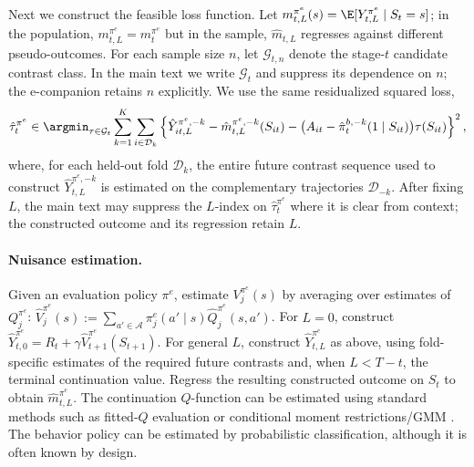 \documentclass[opre,nonblindrev]{informs4}
\newenvironment{revision}{\begingroup\color{revisionblue}\ignorespaces}{\endgroup}
\let\arxivSavedArgmin\argmin
\let\argmin\undefined
\let\argmin\arxivSavedArgmin
\providecommand{\cA}{\mathcal A}
\providecommand{\cG}{\mathcal G}
\begin{document}
\begin{revision}
Next we construct the feasible loss function. Let $m_{t,L}^{\pi^e}(s)
=
\E[ Y_{t,L}^{\pi^e}\mid S_t=s]$;
in the population, $ m_{t,L}^{\pi^e}=m_t^{\pi^e}$ but in the sample, $\hat m_{t,L}$ regresses against different pseudo-outcomes.
For each sample size $n$, let $\cG_{t,n}$ denote the stage-$t$
candidate contrast class. In the main text we write $\cG_t$ and
suppress its dependence on $n$; the e-companion retains $n$ explicitly.
We use the same residualized squared loss,
\begin{equation}
\hat\tau_t^{\pi^e}
\in
\argmin_{\tau\in\mathcal G_t}
\sum_{k=1}^{K}\sum_{i\in\mathcal D_k}
\left\{
\hat{Y}_{it,L}^{\pi^e,-k}
-
\hat{m}_{t,L}^{\pi^e,-k}(S_{it})
-
\big(A_{it}-\hat\pi_t^{b,-k}(1\mid S_{it})\big)\tau(S_{it})
\right\}^2,
\label{eq:recursive-unrolled-loss-main}
\end{equation}
where, for each held-out fold $\mathcal D_k$, the entire future contrast sequence used
to construct $\hat{Y}_{t,L}^{\pi^e,-k}$ is estimated on the
complementary trajectories $\mathcal D_{-k}$. After fixing $L$, the main text may
suppress the $L$-index on $\hat\tau_t^{\pi^e}$ where it is clear from context; the constructed outcome and
its regression retain $L$.

\paragraph{Nuisance estimation.}
Given an evaluation policy $\pi^e$, estimate $V_j^{\pi^e}(s)$ by averaging over estimates of $Q_j^{\pi^e}$: $\hat V_j^{\pi^e}(s)
:=
\sum_{a'\in\cA}
\pi_j^e(a'\mid s)\hat Q_j^{\pi^e}(s,a')$. 
For $L=0$, construct
$\hat Y_{t,0}^{\pi^e}
=R_t+\gamma\hat V_{t+1}^{\pi^e}(S_{t+1})$.
For general $L$, construct $\hat Y_{t,L}^{\pi^e}$ as above, using fold-specific estimates of the
required future contrasts and, when $L<T-t$, the terminal continuation
value. Regress the resulting constructed outcome on $S_t$ to obtain
$\hat m_{t,L}^{\pi^e}$. 
The continuation $Q$-function can be estimated using standard methods such
as fitted-$Q$ evaluation
\citep{le2019batch,chakraborty2014dynamic,duan2021risk} or conditional
moment restrictions/GMM \citep{kallus2019double}. The behavior policy can
be estimated by probabilistic classification, although it is often known
by design.





\end{revision}
\end{document}
